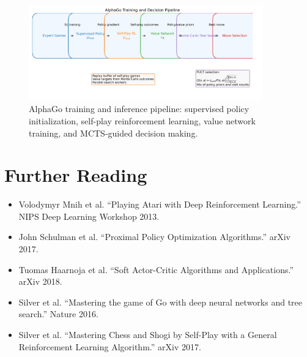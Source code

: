\documentclass{article}
\begin{document}
\begin{figure}[H]
  \centering
  \includegraphics[width=0.9\textwidth]{alphago_pipeline.png}
  \caption{AlphaGo training and inference pipeline: supervised policy initialization, self-play reinforcement learning, value network training, and MCTS-guided decision making.}
  \label{fig:alphago_pipeline}
\end{figure}
\FloatBarrier

\section*{Further Reading}
\begin{itemize}
  \item Volodymyr Mnih et al. ``Playing Atari with Deep Reinforcement Learning.'' NIPS Deep Learning Workshop 2013.
  \item John Schulman et al. ``Proximal Policy Optimization Algorithms.'' arXiv 2017.
  \item Tuomas Haarnoja et al. ``Soft Actor-Critic Algorithms and Applications.'' arXiv 2018.
  \item Silver et al. ``Mastering the game of Go with deep neural networks and tree search.'' Nature 2016.
  \item Silver et al. ``Mastering Chess and Shogi by Self-Play with a General Reinforcement Learning Algorithm.'' arXiv 2017.
\end{itemize}
\end{document}
